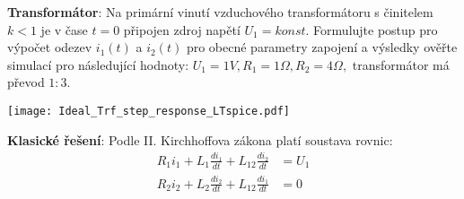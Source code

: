 \begin{example}\label{TEO:exam005} \textbf{Transformátor}: \newline
  Na primární vinutí vzduchového transformátoru s činitelem $k < 1$ je v čase $t=0$ připojen zdroj 
  napětí $U_1 = konst$. Formulujte postup pro výpočet odezev $i_1(t)$ a $i_2(t)$ pro obecné 
  parametry zapojení a výsledky ověřte simulací pro následující hodnoty: $U_1 = 1V, R_1 = 1\Omega, 
  R_2 = 4\Omega, $ transformátor má převod $1:3$.
  
  {\centering
   \captionsetup{type=figure}
   \texttt{[image: Ideal\_Trf\_step\_response\_LTspice.pdf]}
   \label{TEO:fig_trafo_int_uprim}
   \par}
  
  \textbf{Klasické řešení}: Podle II. Kirchhoffova zákona platí soustava rovnic:
  \begin{subequations}\label{TEO:eq_trafo_IIKz}
    \begin{align}
      R_1i_1 + L_1\frac{di_1}{dt} + L_{12}\frac{di_2}{dt} &= U_1 \\
      R_2i_2 + L_2\frac{di_2}{dt} + L_{12}\frac{di_1}{dt} &= 0
    \end{align}
  \end{subequations}
  

\end{example}
